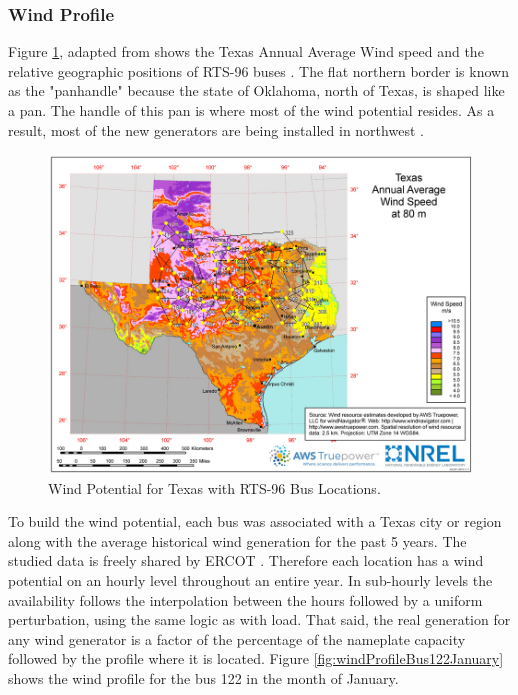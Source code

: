 \documentclass[12pt,LUDisStyle,twosided]{book}
\begin{document}
\newpage
\subsubsection{Wind Profile}


Figure \ref{fig:texasWindProfile}, adapted from \cite{texasWindProfile} shows the Texas Annual Average Wind speed and the relative geographic positions of RTS-96 buses \cite{wongieee}. The flat northern border is known as the "panhandle" because the state of Oklahoma, north of Texas, is shaped like a pan. The handle of this pan is where most of the wind potential resides. As a result, most of the new generators are being installed in northwest \cite{texasWindProfile}.

\begin{figure}[H] 
  \includegraphics[width=\textwidth,keepaspectratio]{texasWindProfileWithBuses.png}
  \caption{Wind Potential for Texas with RTS-96 Bus Locations.}
  \label{fig:texasWindProfile}
\end{figure}


To build the wind potential, each bus was associated with a Texas city or region along with the average historical wind generation for the past 5 years. The studied data is freely shared by ERCOT \cite{ercotGenerationWind}. Therefore each location has a wind potential on an hourly level throughout an entire year. In sub-hourly levels the availability follows the interpolation between the hours followed by a uniform perturbation, using the same logic as with load. That said, the real generation for any wind generator is a factor of the percentage of the nameplate capacity followed by the profile where it is located. Figure \ref{fig:windProfileBus122January} shows the wind profile for the bus 122 in the month of January.
\end{document}
